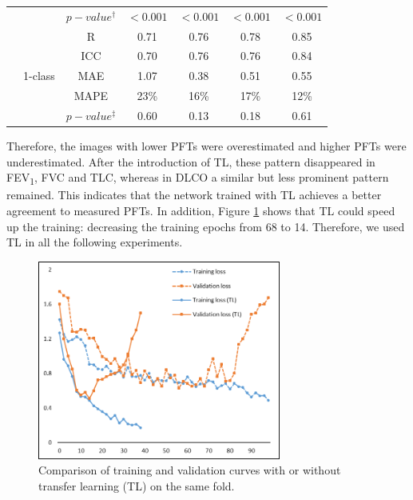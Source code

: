 \begin{table}[tb]
\begin{tabular}{c|c|c|c|c|c|c}
                                                            &                                                        & $p-value^\dag$  & $<0.001$ & $<0.001$ & $<0.001$ & $<0.001$ \\ \cline{2-7} 
                                                            & \multirow{5}{*}{1-class}                               & R         & 0.71     & 0.76     & 0.78     & 0.85     \\
                                                            &                                                        & ICC       & 0.70     & 0.76     & 0.76     & 0.84     \\
                                                            &                                                        & MAE       & 1.07     & 0.38     & 0.51     & 0.55     \\
                                                            &                                                        & MAPE      & 23\%     & 16\%     & 17\%     & 12\%     \\
                                                            &                                                        & $p-value^\ddag$ & 0.60     & 0.13     & 0.18     & 0.61     \\ \hline
\end{tabular}

\label{chap4_table:table_TL}
\end{table}


Therefore, the images with lower PFTs were overestimated and higher PFTs were underestimated. After the introduction of TL, these pattern disappeared in FEV\textsubscript{1}, FVC and TLC, whereas in DLCO a similar but less prominent pattern remained. This indicates that the network trained with TL achieves a better agreement to measured PFTs. In addition, Figure \ref{fig:chap4_lr} shows that TL could speed up the training: decreasing the training epochs from 68 to 14. Therefore, we used TL in all the following experiments. 

\begin{figure}[tb]
    \centering
    \includegraphics[width=8cm]{learning_curve.png}
    \caption{Comparison of training and validation curves with or without transfer learning (TL) on the same fold.}
    \label{fig:chap4_lr}
\end{figure}


